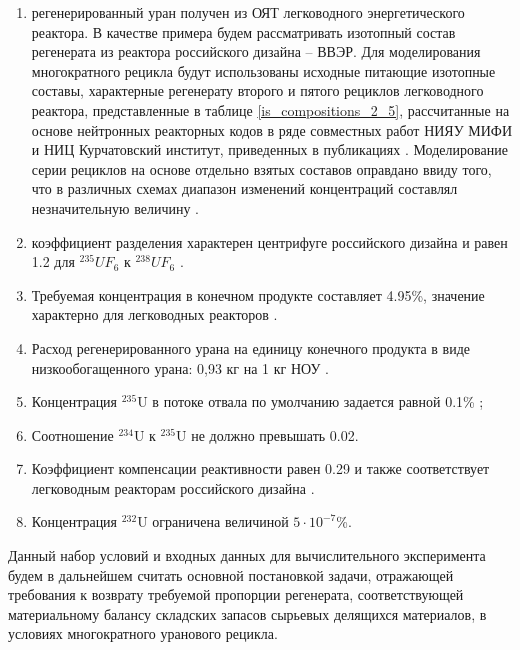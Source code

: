  \begin{enumerate}
  \item регенерированный уран получен из ОЯТ легководного энергетического реактора. В качестве примера будем рассматривать изотопный состав регенерата из реактора российского дизайна -- ВВЭР. Для моделирования многократного рецикла будут использованы исходные питающие изотопные составы, характерные регенерату второго и пятого рециклов легководного реактора, представленные в таблице \ref{is_compositions_2_5}, рассчитанные на основе нейтронных реакторных кодов в ряде совместных работ НИЯУ МИФИ и НИЦ Курчатовский институт, приведенных в публикациях \cite{palkinDesignanalyticalResearchRefinement2010,nevinicaToplivnyyCiklLegkovodnogo2019}. Моделирование серии рециклов на основе отдельно взятых составов оправдано ввиду того, что в различных схемах диапазон изменений концентраций составлял незначительную величину \cite{smirnovEvolutionIsotopicComposition2012}.
  \item коэффициент разделения характерен центрифуге российского дизайна и равен 1.2 для $^{235}UF_6$ к $^{238}UF_6$ \cite{smirnovEvolutionIsotopicComposition2012}.
  \item Требуемая концентрация в конечном продукте составляет 4.95\%, значение характерно для легководных реакторов \cite{solovevaCennostiOYaTKak2019}.
  \item Расход регенерированного урана на единицу конечного продукта в виде низкообогащенного урана: 0,93 кг на 1 кг НОУ \cite{smirnovApplyingEnrichmentCapacities2018}.
  \item Концентрация $^{235}$U в потоке отвала по умолчанию задается равной 0.1\% \cite{smirnovEvolutionIsotopicComposition2012};
  \item Соотношение $^{234}$U к $^{235}$U не должно превышать 0.02.
  \item Коэффициент компенсации реактивности равен 0.29 и также соответствует легководным реакторам российского дизайна \cite{smirnovApplyingEnrichmentCapacities2018}.
  \item Концентрация $^{232}$U ограничена величиной $5\cdot10^{-7}$\%.
\end{enumerate}

Данный набор условий и входных данных для вычислительного эксперимента будем в дальнейшем считать основной постановкой задачи, отражающей требования к возврату требуемой пропорции регенерата, соответствующей материальному балансу складских запасов сырьевых делящихся материалов, в условиях многократного уранового рецикла.


